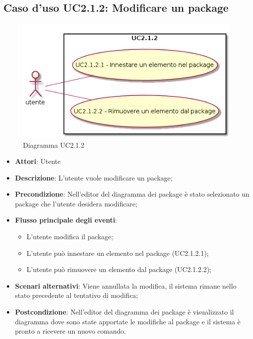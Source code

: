 \documentclass[../AnalisiDeiRequisiti.tex]{subfiles}
\begin{document}
	\subsection{Caso d'uso UC2.1.2: Modificare un package}
	\begin{figure} [H]
		\centering
		\includegraphics[scale=0.45]{./Figures/UC2.1.2.png}
		\caption{Diagramma UC2.1.2}\label{}
	\end{figure}
	\begin{itemize}
		\item \textbf{Attori}: Utente
		\item \textbf{Descrizione}: L'utente vuole modificare un package;
		\item \textbf{Precondizione}: Nell'editor del diagramma dei package è stato selezionato un package che l'utente desidera modificare;
		\item \textbf{Flusso principale degli eventi}: \begin{itemize}
			\item L'utente modifica il package;
			\item L'utente può innestare un elemento nel package (UC2.1.2.1);
			\item L'utente può rimuovere un elemento dal package (UC2.1.2.2);
		\end{itemize}
		\item \textbf{Scenari alternativi}: Viene annullata la modifica, il sistema	rimane nello stato precedente al tentativo di modifica;
		\item \textbf{Postcondizione}: Nell'editor del diagramma dei package è visualizzato il diagramma dove sono state apportate le modifiche al package e il sistema è pronto a ricevere un nuovo comando.
	\end{itemize}
\end{document}
